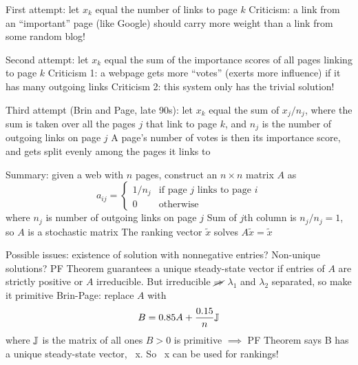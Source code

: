 \documentclass[aspectratio=169]{beamer}\usepackage[]{graphicx}\usepackage[]{xcolor}
\begin{document}
\begin{frame}{}
	First attempt: let $x_k$ equal the number of links to page $k$
\vfill
	Criticism: a link from an ``important'' page (like Google) should carry more weight than a link from some random blog!
\end{frame}

\begin{frame}{}
	Second attempt: let $x_k$ equal the sum of the importance scores of all pages linking to page $k$
	\vfill
	Criticism 1: a webpage gets more ``votes'' (exerts more influence) if it has many outgoing links
	\vfill
	Criticism 2: this system only has the trivial solution!	
\end{frame}


\begin{frame}{}
	Third attempt (Brin and Page, late 90s): let $x_k$ equal the sum of $x_j/n_j$, where
	the sum is taken over all the pages $j$ that link to page $k$, and $n_j$ is the number of outgoing links on page $j$
	\vfill
	A page's number of votes is then its importance score, and gets split evenly among the pages it links to
\end{frame}

\begin{frame}{}
	Summary: given a web with $n$ pages, construct an $n\times n$ matrix $A$ as
	\[
	a_{ij} =
	\begin{cases}
		1/n_j & \text{if page $j$ links to page $i$} \\
		0 & \text{otherwise}
	\end{cases}
	\]
	where $n_j$ is number of outgoing links on page $j$
	\vfill
	Sum of $j$th column is $n_j/n_j = 1$, so $A$ is a stochastic matrix
	\vfill
	The ranking vector $\tilde x$ solves $A\tilde x = \tilde x$
\end{frame}


\begin{frame}{}
	Possible issues: existence of solution with nonnegative entries? Non-unique solutions?	
	\vfill
	PF Theorem guarantees a unique steady-state vector if entries of $A$ are strictly positive or $A$ irreducible. But irreducible $\cancel{\Rightarrow}$ $\lambda_1$ and $\lambda_2$ separated, so make it primitive
	\vfill
	Brin-Page: replace $A$ with
	\[
		B = 0.85A + \frac{0.15}{n}\mathbb{J}
	\]
	where $\mathbb{J}$ is the matrix of all ones
\vfill
$B>0$ is primitive $\implies$
PF Theorem says B has a unique steady-state vector, ~x.
So ~x can be used for rankings!
\end{frame}
\end{document}
